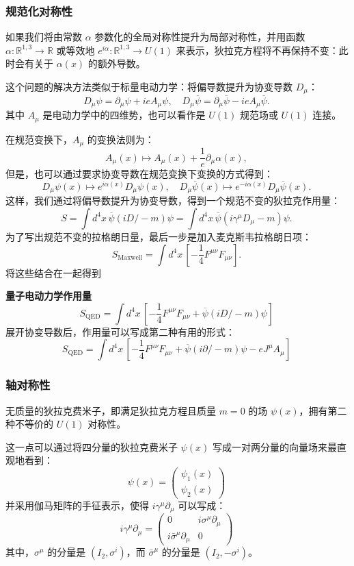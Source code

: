 \subsubsection{规范化对称性} 
如果我们将由常数 \( \alpha \) 参数化的全局对称性提升为局部对称性，并用函数 \( \alpha : \mathbb{R}^{1,3} \to \mathbb{R} \) 或等效地 \( e^{i\alpha} : \mathbb{R}^{1,3} \to U(1) \) 来表示，狄拉克方程将不再保持不变：此时会有关于 \( \alpha(x) \) 的额外导数。

这个问题的解决方法类似于标量电动力学：将偏导数提升为协变导数 \( D_{\mu} \)：
\[
D_{\mu} \psi = \partial_{\mu} \psi + ieA_{\mu} \psi, \quad D_{\mu} \overline{\psi} = \partial_{\mu} \overline{\psi} - ieA_{\mu} \overline{\psi}.~
\]
其中 \( A_{\mu} \) 是电动力学中的四维势，也可以看作是 \( U(1) \) 规范场或 \( U(1) \) 连接。

在规范变换下，\( A_{\mu} \) 的变换法则为：
\[
A_{\mu}(x) \mapsto A_{\mu}(x) + \frac{1}{e} \partial_{\mu} \alpha(x),~
\]
但是，也可以通过要求协变导数在规范变换下变换的方式得到：
\[
D_{\mu} \psi(x) \mapsto e^{i\alpha(x)} D_{\mu} \psi(x), \quad D_{\mu} \overline{\psi}(x) \mapsto e^{-i\alpha(x)} D_{\mu} \overline{\psi}(x).~
\]
这样，我们通过将偏导数提升为协变导数，得到一个规范不变的狄拉克作用量：
\[
S = \int d^4x \, \overline{\psi} \left( i D\!\!\!\!\big/ - m \right) \psi = \int d^4x \, \overline{\psi} \left( i \gamma^{\mu} D_{\mu} - m \right) \psi.~
\]
为了写出规范不变的拉格朗日量，最后一步是加入麦克斯韦拉格朗日项：
\[
S_{\text{Maxwell}} = \int d^4x \, \left[ -\frac{1}{4} F^{\mu \nu} F_{\mu \nu} \right].~
\]
将这些结合在一起得到

\textbf{量子电动力学作用量 } 
\[
S_{\text{QED}} = \int d^4x \, \left[-\frac{1}{4} F^{\mu \nu} F_{\mu \nu} + \overline{\psi} \left( iD\!\!\!\!\big/ - m \right) \psi \right]~
\]
展开协变导数后，作用量可以写成第二种有用的形式：
\[
S_{\text{QED}} = \int d^4x \, \left[ -\frac{1}{4} F^{\mu \nu} F_{\mu \nu} + \overline{\psi} \left( i\partial \!\!\!{\big /} - m \right) \psi - e J^{\mu} A_{\mu} \right]~
\]
\subsubsection{轴对称性}
无质量的狄拉克费米子，即满足狄拉克方程且质量 \( m = 0 \) 的场 \(\psi(x)\)，拥有第二种不等价的 \( U(1) \) 对称性。

这一点可以通过将四分量的狄拉克费米子 \(\psi(x)\) 写成一对两分量的向量场来最直观地看到：
\[
\psi(x) = \begin{pmatrix} \psi_1(x) \\ \psi_2(x) \end{pmatrix}~
\]
并采用伽马矩阵的手征表示，使得 \( i\gamma^\mu \partial_\mu \) 可以写成：
\[
i\gamma^\mu \partial_\mu = \begin{pmatrix} 0 & i\sigma^\mu \partial_\mu \\ i\bar{\sigma}^\mu \partial_\mu & 0 \end{pmatrix}~
\]
其中，\(\sigma^\mu\) 的分量是 \((I_2, \sigma^i)\)，而 \(\bar{\sigma}^\mu\) 的分量是 \((I_2, -\sigma^i)\)。

